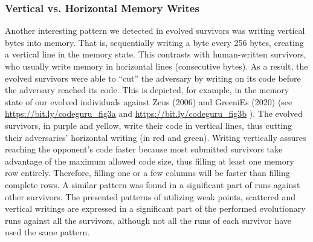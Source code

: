 \documentclass[dvipsnames, format=sigconf]{acmart}
\begin{document}

\subsubsection{Vertical vs. Horizontal Memory Writes}
\label{vertical}
Another interesting pattern we detected in evolved survivors was writing vertical bytes into memory. That is, sequentially writing a byte every 256 bytes, creating a vertical line in the memory state. This contrasts with human-written survivors, who usually write memory in horizontal lines (consecutive bytes). As a result, the evolved survivors were able to ``cut'' the adversary by writing on its code before the adversary reached its code. This is depicted, for example, in the memory state of our evolved individuals against Zeus (2006) and GreeniEs (2020) (see 
\url{https://bit.ly/codeguru_fig3a} and \url{https://bit.ly/codeguru_fig3b}
). The evolved survivors, in purple and yellow, write their code in vertical lines, thus cutting their adversaries' horizontal writing (in red and green). Writing vertically assures reaching the opponent's code faster because most submitted survivors take advantage of the maximum allowed code size, thus filling at least one memory row entirely. Therefore, filling one or a few columns will be faster than filling complete rows. A similar pattern was found in a significant part of runs against other survivors.
The presented patterns of utilizing weak points, scattered and vertical writings are expressed in a significant part of the performed evolutionary runs against all the survivors, although not all the runs of each survivor have used the same pattern.
\end{document}
